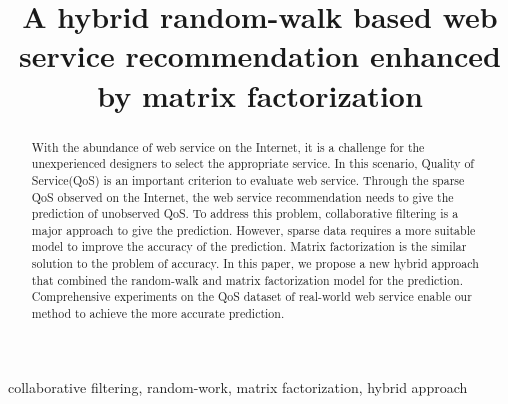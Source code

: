 \documentclass[conference]{IEEEtran}
\begin{document}
\title{A hybrid random-walk based web service recommendation enhanced by matrix factorization}

\author{
  \and
}

\maketitle

\begin{abstract}
With the abundance of web service on the Internet, it is a challenge for the unexperienced designers to select the appropriate service. In this scenario, Quality of Service(QoS) is an important criterion to evaluate web service. Through the sparse QoS observed on the Internet, the web service recommendation needs to give the prediction of unobserved QoS. To address this problem, collaborative filtering is a major approach to give the prediction. However, sparse data requires a more suitable model to improve the accuracy of the prediction. Matrix factorization is the similar solution to the problem of accuracy. In this paper, we propose a new hybrid approach that combined the random-walk and matrix factorization model for the prediction. Comprehensive experiments on the QoS dataset of real-world web service enable our method to achieve the more accurate prediction.
\end{abstract}

\begin{IEEEkeywords}
  collaborative filtering, random-work, matrix factorization, hybrid approach
\end{IEEEkeywords}

\IEEEpeerreviewmaketitle

\end{document}
